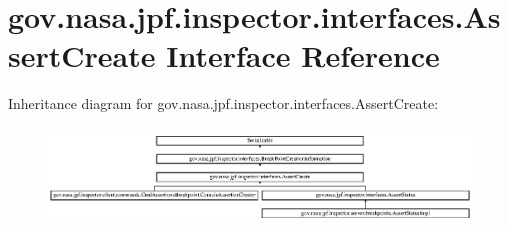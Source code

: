 \hypertarget{interfacegov_1_1nasa_1_1jpf_1_1inspector_1_1interfaces_1_1_assert_create}{}\section{gov.\+nasa.\+jpf.\+inspector.\+interfaces.\+Assert\+Create Interface Reference}
\label{interfacegov_1_1nasa_1_1jpf_1_1inspector_1_1interfaces_1_1_assert_create}
Inheritance diagram for gov.\+nasa.\+jpf.\+inspector.\+interfaces.\+Assert\+Create\+:\begin{figure}[H]
\begin{center}
\leavevmode
\includegraphics[height=2.607076cm]{interfacegov_1_1nasa_1_1jpf_1_1inspector_1_1interfaces_1_1_assert_create}
\end{center}
\end{figure}
